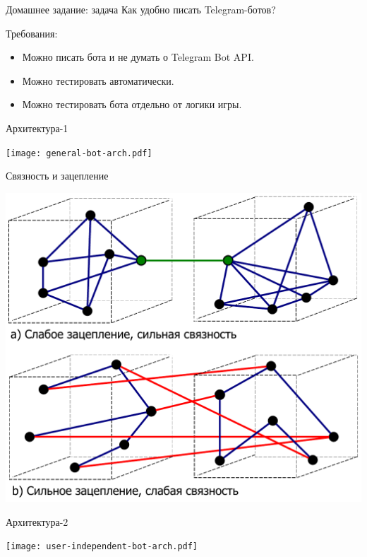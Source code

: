\begin{frame}[t]{Домашнее задание: задача}
Как удобно писать Telegram-ботов?

Требования:
\begin{itemize}
\item Можно писать бота и не думать о Telegram Bot API.
\item Можно тестировать автоматически.
\item Можно тестировать бота отдельно от логики игры.
\end{itemize}
\end{frame}

\begin{frame}[t]{Архитектура-1}
\begin{center}
	\texttt{[image: general-bot-arch.pdf]}
\end{center}
\end{frame}

\begin{frame}[t]{Связность и зацепление}
\begin{center}
	\includegraphics[height=0.8\textheight]{CouplingVsCohesion.pdf}
\end{center}
\end{frame}

\begin{frame}[t]{Архитектура-2}
\begin{center}
	\texttt{[image: user-independent-bot-arch.pdf]}
\end{center}
\end{frame}

